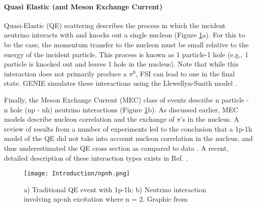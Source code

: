 \paragraph{ Quasi Elastic (and Meson Exchange Current) }
Quasi-Elastic (QE) scattering describes the process in which the incident neutrino interacts with and knocks out a single nucleon (Figure \ref{fig:npnh}a). For this to be the case, the momentum transfer to the nucleon must be small relative to the energy of the incident particle. This process is known as 1 particle-1 hole (e.g., 1 particle is knocked out and leaves 1 hole in the nucleus). Note that while this interaction does not primarily produce a $\pi^0$, FSI can lead to one in the final state. GENIE simulates these interactions using the Llewellyn-Smith model \cite{bib:llewellyn}.
\par Finally, the Meson Exchange Current (MEC) class of events describe n particle - n hole (np - nh) neutrino interactions (Figure \ref{fig:npnh}b). As discussed earlier, MEC models describe nucleon correlation and the exchange of $\pi$'s in the nucleus. A review of results from a number of experiments led to the conclusion that a 1p-1h model of the QE did not take into account nucleon correlation in the nucleus, and thus underestimated the QE cross section as compared to data \cite{bib:martini_mec}. A recent, detailed description of these interaction types exists in Ref. \cite{bib:katori_martini}. 

\begin{figure}[H]
\centering
\texttt{[image: Introduction/npnh.png]}
\caption{a) Traditional QE event with 1p-1h; b) Neutrino interaction involving np-nh excitation where n = 2. Graphic from \cite{bib:katori_martini} } 
\label{fig:npnh}
\end{figure}


